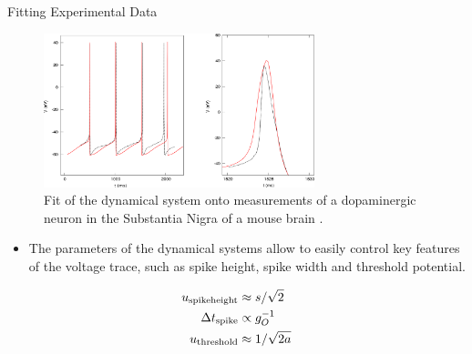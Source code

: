 \documentclass{beamer}
\begin{document}
\begin{frame}[t]
\begin{columns}[t]
\begin{column}{.45\textwidth}
\begin{myblock}{Fitting Experimental Data}
\begin{figure}
\includegraphics[width=0.7\textwidth]{../figures/graphics/spikefit.png}
\caption{Fit of the dynamical system onto measurements of a dopaminergic
neuron in the Substantia Nigra of a mouse brain \cite{Bean_2007}.}
\label{fig:spikefit}
\end{figure}
\begin{itemize}
\item The parameters of the dynamical systems allow to easily control key features of the voltage trace, such as spike height, spike width and threshold potential.
\end{itemize}
\begin{align*}
u_{\rm spike height} &\approx s/\sqrt{2} \\
\Delta t_{\rm spike} &\propto g_O^{-1} \\
u_{\rm threshold} &\approx 1/\sqrt{2a}
\end{align*}
\end{myblock}


\end{column}
\end{columns}
\end{frame}
\end{document}
